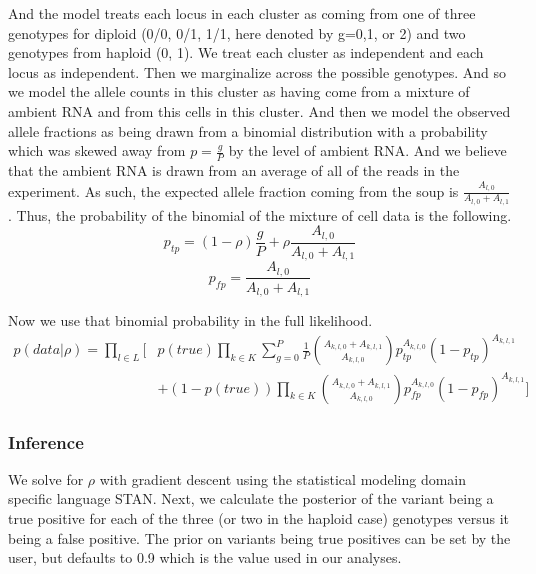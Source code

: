 And the model treats each locus in each cluster as coming from one of three genotypes for diploid (0/0, 0/1, 1/1, here denoted by g=0,1, or 2) and two genotypes from haploid (0, 1). We 
treat each cluster as independent and each locus as independent. Then we marginalize across the possible genotypes.  
And so we model the allele counts in this cluster as having come from 
a mixture of ambient RNA and from this cells in this cluster. And then we model the observed allele fractions as being drawn from a binomial distribution 
with a probability which was skewed away from $p=\frac{g}{P}$ by the level of ambient RNA. And we believe that the ambient RNA is drawn from 
an average of all of the reads in the experiment. As such, the expected allele fraction coming from the soup is $\frac{A_{l,0}}{A_{l,0} + A_{l,1}}$. 
Thus, the probability of the binomial of the mixture of cell data is the following.
\begin{equation}
p_{tp} = (1-\rho)\frac{g}{P} + \rho \frac{A_{l,0}}{A_{l,0}+A_{l,1}}
\end{equation}
\begin{equation}
p_{fp} = \frac{A_{l,0}}{A_{l,0}+A_{l,1}}
\end{equation}



Now we use that binomial probability in the full likelihood.
\begin{equation}
\begin{split}
p(data | \rho) = \prod_{l \in L} \bigg[ & p(true) \prod_{k \in K} \sum_{g = 0}^P \frac{1}{P} \binom{A_{k,l,0} + A_{k,l,1}}{A_{k,l,0}} p_{tp}^{A_{k,l,0}} (1-p_{tp})^{A_{k,l,1}} \\
 & + (1-p(true))\prod_{k \in K}\binom{A_{k,l,0} + A_{k,l,1}}{A_{k,l,0}}p_{fp}^{A_{k,l,0}} (1-p_{fp})^{A_{k,l,1}}  \bigg]
\end{split}
\end{equation}

\subsubsection{Inference}
We solve for $\rho$ with gradient descent using the statistical modeling domain specific language STAN. Next, we calculate the posterior of the variant being a true positive for each of the three (or two in the haploid case) genotypes versus it being a false positive. The prior on variants being true positives can be set by the user, but defaults to 0.9 which is the value used in our analyses.




